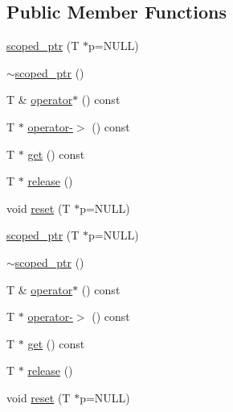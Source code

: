 \subsection*{Public Member Functions}
\begin{DoxyCompactItemize}
\item 
\hyperlink{classtesting_1_1internal_1_1scoped__ptr_adb972432999a0c63720df148964ac2a5}{scoped\-\_\-ptr} (T $\ast$p=N\-U\-L\-L)
\item 
\hyperlink{classtesting_1_1internal_1_1scoped__ptr_ab721de9bf4369f002fb563e82352ee36}{$\sim$scoped\-\_\-ptr} ()
\item 
T \& \hyperlink{classtesting_1_1internal_1_1scoped__ptr_ab197837f87062de69d9d6e04539bbabe}{operator$\ast$} () const 
\item 
T $\ast$ \hyperlink{classtesting_1_1internal_1_1scoped__ptr_adc38310fbbe400faf9279e36000a17c4}{operator-\/$>$} () const 
\item 
T $\ast$ \hyperlink{classtesting_1_1internal_1_1scoped__ptr_adc8f8fcb63ce69f80f011456e6d2f08d}{get} () const 
\item 
T $\ast$ \hyperlink{classtesting_1_1internal_1_1scoped__ptr_a7a4f3e568d81a5d8bcb5f8d6bf5130b1}{release} ()
\item 
void \hyperlink{classtesting_1_1internal_1_1scoped__ptr_acac03266a43359801aff0de5c990bec0}{reset} (T $\ast$p=N\-U\-L\-L)
\item 
\hyperlink{classtesting_1_1internal_1_1scoped__ptr_adb972432999a0c63720df148964ac2a5}{scoped\-\_\-ptr} (T $\ast$p=N\-U\-L\-L)
\item 
\hyperlink{classtesting_1_1internal_1_1scoped__ptr_ab721de9bf4369f002fb563e82352ee36}{$\sim$scoped\-\_\-ptr} ()
\item 
T \& \hyperlink{classtesting_1_1internal_1_1scoped__ptr_ab197837f87062de69d9d6e04539bbabe}{operator$\ast$} () const 
\item 
T $\ast$ \hyperlink{classtesting_1_1internal_1_1scoped__ptr_adc38310fbbe400faf9279e36000a17c4}{operator-\/$>$} () const 
\item 
T $\ast$ \hyperlink{classtesting_1_1internal_1_1scoped__ptr_adc8f8fcb63ce69f80f011456e6d2f08d}{get} () const 
\item 
T $\ast$ \hyperlink{classtesting_1_1internal_1_1scoped__ptr_a7a4f3e568d81a5d8bcb5f8d6bf5130b1}{release} ()
\item 
void \hyperlink{classtesting_1_1internal_1_1scoped__ptr_acac03266a43359801aff0de5c990bec0}{reset} (T $\ast$p=N\-U\-L\-L)
\end{DoxyCompactItemize}


